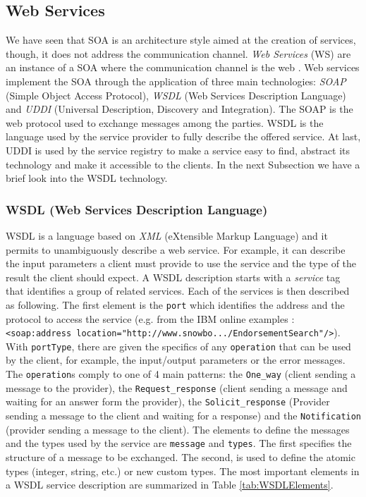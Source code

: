 \subsection{Web Services}
\label{WebServices}
We have seen that SOA is an architecture style aimed at the creation of services, though, it does not address the communication channel. \textit{Web Services} (WS) are an instance of a SOA where the communication channel is the web \cite{Pernici04}.
Web services implement the SOA through the application of three main technologies: \textit{SOAP} (Simple Object Access Protocol), \textit{WSDL} (Web Services Description Language) and \textit{UDDI} (Universal Description, Discovery and Integration).
The SOAP is the web protocol used to exchange messages among the parties. WSDL is the language used by the service provider to fully describe the offered service. At last, UDDI is used by the service registry to make a service easy to find, abstract its technology and make it accessible to the clients.
In the next Subsection we have a brief look into the WSDL technology.

\subsubsection{WSDL (Web Services Description Language) }
\label{Wsdl}
WSDL is a language based on \textit{XML} (eXtensible Markup Language) and it permits to unambiguously describe a web service. For example, it can describe the input parameters a client must provide to use the service and the type of the result the client should expect. 
A WSDL description starts with a \textit{service} tag that identifies a group of related services. Each of the services is then described as following.
The first element is the \verb|port| which identifies the address and the protocol to access the service (e.g. from the IBM online examples \cite{IBMWSDL}: \\
\verb|<soap:address location="http://www.snowbo.../EndorsementSearch"/>|). \\
With \verb|portType|, there are given the specifics of any \verb|operation| that can be used by the client, for example, the input/output parameters or the error messages. The \verb|operation|s comply to one of 4 main patterns: the \verb|One_way| (client sending a message to the provider), the \verb|Request_response| (client sending a message and waiting for an answer form the provider), the \verb|Solicit_response| (Provider sending a message to the client and waiting for a response) and the \verb|Notification| (provider sending a message to the client).
The elements to define the messages and the types used by the service are \verb|message| and \verb|types|. The first specifies the structure of a message to be exchanged. The second, is used to define the atomic types (integer, string, etc.) or new custom types. 
The most important elements in a WSDL service description are summarized in Table \ref{tab:WSDLElements}.

